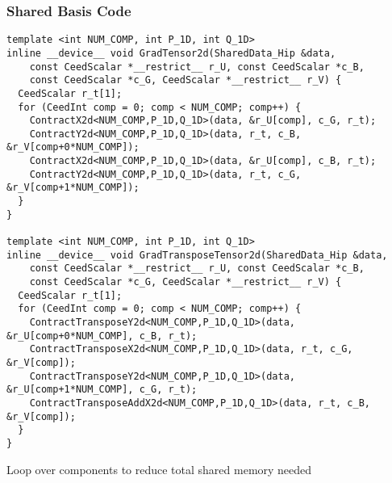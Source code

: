 \documentclass{beamer}
\begin{document}
\begin{frame}[fragile]
\begin{center}
\frametitle{Shared Basis Code}

{\tiny
\begin{lstlisting}[style=boxedC]
template <int NUM_COMP, int P_1D, int Q_1D>
inline __device__ void GradTensor2d(SharedData_Hip &data,
    const CeedScalar *__restrict__ r_U, const CeedScalar *c_B,
    const CeedScalar *c_G, CeedScalar *__restrict__ r_V) {
  CeedScalar r_t[1];
  for (CeedInt comp = 0; comp < NUM_COMP; comp++) {
    ContractX2d<NUM_COMP,P_1D,Q_1D>(data, &r_U[comp], c_G, r_t);
    ContractY2d<NUM_COMP,P_1D,Q_1D>(data, r_t, c_B, &r_V[comp+0*NUM_COMP]);
    ContractX2d<NUM_COMP,P_1D,Q_1D>(data, &r_U[comp], c_B, r_t);
    ContractY2d<NUM_COMP,P_1D,Q_1D>(data, r_t, c_G, &r_V[comp+1*NUM_COMP]);
  }
}

template <int NUM_COMP, int P_1D, int Q_1D>
inline __device__ void GradTransposeTensor2d(SharedData_Hip &data,
    const CeedScalar *__restrict__ r_U, const CeedScalar *c_B,
    const CeedScalar *c_G, CeedScalar *__restrict__ r_V) {
  CeedScalar r_t[1];
  for (CeedInt comp = 0; comp < NUM_COMP; comp++) {
    ContractTransposeY2d<NUM_COMP,P_1D,Q_1D>(data, &r_U[comp+0*NUM_COMP], c_B, r_t);
    ContractTransposeX2d<NUM_COMP,P_1D,Q_1D>(data, r_t, c_G, &r_V[comp]);
    ContractTransposeY2d<NUM_COMP,P_1D,Q_1D>(data, &r_U[comp+1*NUM_COMP], c_G, r_t);
    ContractTransposeAddX2d<NUM_COMP,P_1D,Q_1D>(data, r_t, c_B, &r_V[comp]);
  }
}

\end{lstlisting}
}

Loop over components to reduce total shared memory needed\\

\end{center}
\end{frame}

\end{document}
